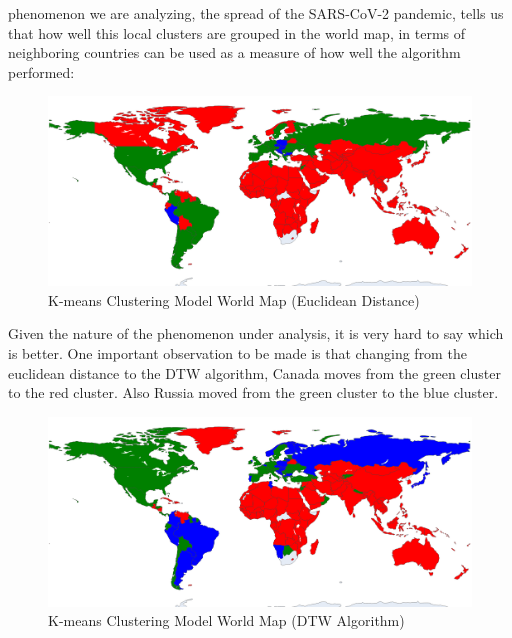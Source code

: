 \documentclass[11pt,a4paper]{article}
\begin{document}
phenomenon we are analyzing, the spread of the SARS-CoV-2 pandemic, tells us
that how well this local clusters are grouped in the world map, in terms of
neighboring countries can be used as a measure of how well the algorithm
performed:
\begin{figure}[H]
    \begin{center}
        \includegraphics[scale=0.22]{img/euclidean-clusters-map.png}
    \end{center}
    \vspace{-0.2cm}
    \caption{K-means Clustering Model World Map (Euclidean Distance)}
\end{figure}
\noindent
Given the nature of the phenomenon under analysis, it is very hard to say which
is better. One important observation to be made is that changing from the
euclidean distance to the DTW algorithm, Canada moves from the
{\color{ForestGreen}green cluster} to the {\color{red}red cluster}. Also Russia
moved from the {\color{ForestGreen}green cluster} to the {\color{blue}blue
cluster}.
\begin{figure}[H]
    \begin{center}
        \includegraphics[scale=0.22]{img/dtw-clusters-map.png}
    \end{center}
    \vspace{-0.2cm}
    \caption{K-means Clustering Model World Map (DTW Algorithm)}
\end{figure}
\end{document}
